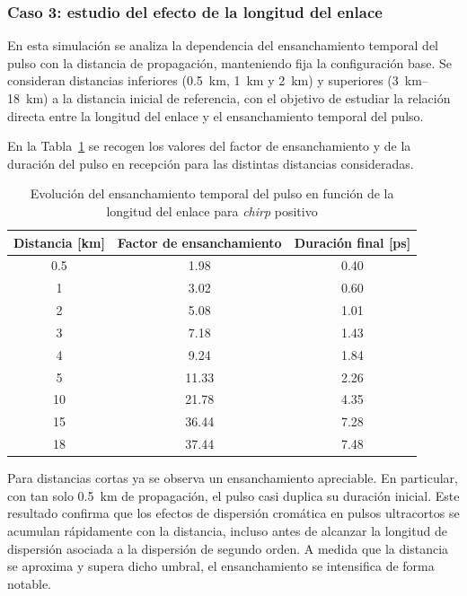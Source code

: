 \subsubsection*{Caso 3: estudio del efecto de la longitud del enlace}

En esta simulación se analiza la dependencia del ensanchamiento temporal del pulso con la distancia de propagación, manteniendo fija la configuración base. Se consideran distancias inferiores (\SI{0.5}{\kilo\metre}, \SI{1}{\kilo\metre} y \SI{2}{\kilo\metre}) y superiores (\SIrange{3}{18}{\kilo\metre}) a la distancia inicial de referencia, con el objetivo de estudiar la relación directa entre la longitud del enlace y el ensanchamiento temporal del pulso.

En la Tabla~\ref{tabla_longitud_enlace} se recogen los valores del factor de ensanchamiento y de la duración del pulso en recepción para las distintas distancias consideradas.

\begin{table}[H]
\centering
\renewcommand{\arraystretch}{1.2}
\begin{tabular}{|c|c|c|}
\hline
\textbf{Distancia [km]} & \textbf{Factor de ensanchamiento} & \textbf{Duración final [ps]} \\
\hline
0.5  & 1.98  & 0.40 \\
1    & 3.02  & 0.60 \\
2    & 5.08  & 1.01 \\
3    & 7.18  & 1.43 \\
4    & 9.24  & 1.84 \\
5    & 11.33 & 2.26 \\
10   & 21.78 & 4.35 \\
15   & 36.44 & 7.28 \\
18   & 37.44 & 7.48 \\
\hline
\end{tabular}
\caption{Evolución del ensanchamiento temporal del pulso en función de la longitud del enlace para \textit{chirp} positivo}
\label{tabla_longitud_enlace}
\end{table}

Para distancias cortas ya se observa un ensanchamiento apreciable. En particular, con tan solo \SI{0.5}{\kilo\metre} de propagación, el pulso casi duplica su duración inicial. Este resultado confirma que los efectos de dispersión cromática en pulsos ultracortos se acumulan rápidamente con la distancia, incluso antes de alcanzar la longitud de dispersión asociada a la dispersión de segundo orden. A medida que la distancia se aproxima y supera dicho umbral, el ensanchamiento se intensifica de forma notable.

